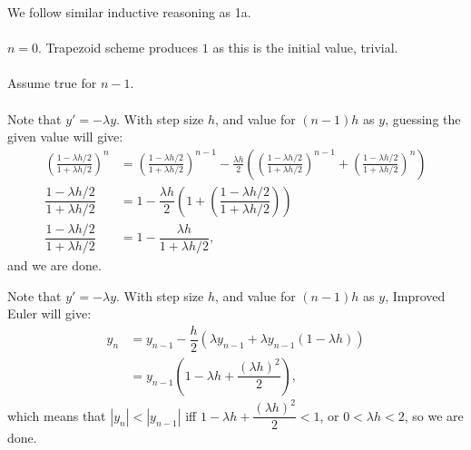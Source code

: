 \documentclass[11pt]{article}
\begin{document}
    \begin{solution}[Solution 1b]
        We follow similar inductive reasoning as 1a. \\~\\
        \BCID $n=0$. Trapezoid scheme produces $1$ as this is the initial value, trivial. \\~\\
        \IHID Assume true for $n-1$. \\~\\
        \ISID Note that $y' = -\lambda y$. With step size $h$, and value for $(n-1)h$ as $y$, guessing the given value will give:
        \begin{align}
            \textstyle
            \left(\frac{1-\lambda h/2}{1+\lambda h/2}\right)^n &= \textstyle \left(\frac{1-\lambda h/2}{1+\lambda h/2}\right)^{n-1} - \frac{\lambda h}{2} \left(\left(\frac{1-\lambda h/2}{1+\lambda h/2}\right)^{n-1} + \left(\frac{1-\lambda h/2}{1+\lambda h/2}\right)^n \right) \\
            \displaystyle
            \dfrac{1-\lambda h/2}{1+\lambda h/2} &= 1 - \dfrac{\lambda h}{2} \left(1 + \left(\dfrac{1-\lambda h/2}{1+\lambda h/2}\right) \right) \\
            \dfrac{1-\lambda h/2}{1+\lambda h/2} &= 1 - \dfrac{\lambda h}{1+\lambda h/2},
        \end{align}
        and we are done.
    \end{solution}
    \begin{solution}[Solution 1c]
        Note that $y' = -\lambda y$. With step size $h$, and value for $(n-1)h$ as $y$, Improved Euler will give:
        \begin{align}
            y_n &= y_{n-1} - \dfrac{h}{2} \left( \lambda y_{n-1} + \lambda y_{n-1} (1-\lambda h) \right) \\ 
            &= y_{n-1} \left(1 - \lambda h + \dfrac{(\lambda h)^2}{2}\right),
        \end{align}
        which means that $|y_n| < |y_{n-1}|$ iff $1 - \lambda h + \dfrac{(\lambda h)^2}{2} < 1$, or $0 < \lambda h < 2$, so we are done.
    \end{solution}
    \newpage
\end{document}
